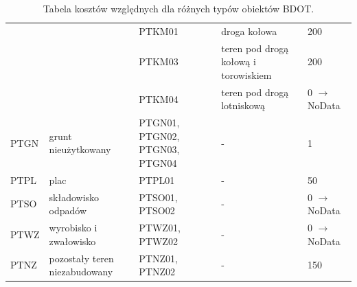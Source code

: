 \documentclass{article}
\begin{document}
\begin{table}[ht]
\begin{tabular}{|p{2cm}|p{4.5cm}|p{2cm}|p{3cm}|p{2cm}|}
    & & PTKM01 & droga kołowa & 200 \\ \cline{3-5}
    & & PTKM03 & teren pod drogą \newline kołową \newline i torowiskiem & 200 \\ \cline{3-5}
    & & PTKM04 & teren pod drogą \newline lotniskową & 0 $\rightarrow$ NoData \\ 
    \hline
    PTGN & grunt nieużytkowany & PTGN01, PTGN02, PTGN03, PTGN04 & - & 1 \\ 
    \hline
    PTPL & plac & PTPL01 & - & 50 \\ 
    \hline
    PTSO & składowisko odpadów & PTSO01, PTSO02 & - & 0 $\rightarrow$ NoData \\ 
    \hline
    PTWZ & wyrobisko i zwałowisko & PTWZ01, PTWZ02 & - & 0 $\rightarrow$ NoData \\ 
    \hline
    PTNZ & pozostały teren niezabudowany & PTNZ01, PTNZ02 & - & 150 \\ 
    \hline
    \end{tabular}
    \caption{Tabela kosztów względnych dla różnych typów obiektów BDOT.}
    \label{tab:bdot_costs}
\end{table}
\end{document}
